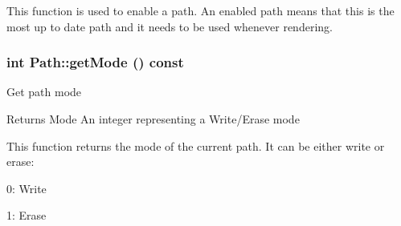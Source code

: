 This function is used to enable a path. An enabled path means that this is the most up to date path and it needs to be used whenever rendering. \hypertarget{classPath_a8735925feeee073c98906c0d8dd00397}{
\subsubsection[{getMode}]{\setlength{\rightskip}{0pt plus 5cm}int Path::getMode () const}}
\label{classPath_a8735925feeee073c98906c0d8dd00397}
Get path mode \begin{DoxyReturn}{Returns}
Mode An integer representing a Write/Erase mode
\end{DoxyReturn}
This function returns the mode of the current path. It can be either write or erase:
\begin{DoxyItemize}
\item 0: Write
\item 1: Erase
\end{DoxyItemize}

